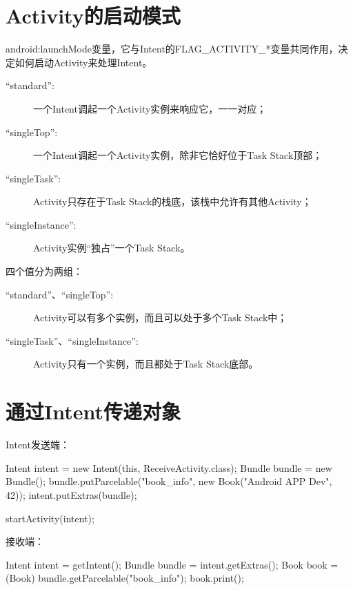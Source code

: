 ﻿\documentclass[a4paper,11pt]{article}
\begin{document}

  \section[Activity的启动模式]{Activity的启动模式}
  android:launchMode变量，它与Intent的FLAG\_ACTIVITY\_*变量共同作用，决定如何启动Activity来处理Intent。

  \begin{description}
    \item[``standard'':] 一个Intent调起一个Activity实例来响应它，一一对应；
    \item[``singleTop'':] 一个Intent调起一个Activity实例，除非它恰好位于Task Stack顶部；
    \item[``singleTask'':] Activity只存在于Task Stack的栈底，该栈中允许有其他Activity；
    \item[``singleInstance'':] Activity实例“独占”一个Task Stack。
  \end{description}

  四个值分为两组：

  \begin{description}
    \item[``standard''、``singleTop'':] Activity可以有多个实例，而且可以处于多个Task Stack中；
    \item[``singleTask''、``singleInstance'':] Activity只有一个实例，而且都处于Task Stack底部。
  \end{description}


  \section[通过Intent传递对象]{通过Intent传递对象}
  Intent发送端：\par
  \begin{javacode}
Intent intent = new Intent(this, ReceiveActivity.class);
Bundle bundle = new Bundle();
bundle.putParcelable("book_info", new Book("Android APP Dev", 42));
intent.putExtras(bundle);

startActivity(intent);
  \end{javacode}

  接收端：\par
  \begin{javacode}
Intent intent = getIntent();
Bundle bundle = intent.getExtras();
Book book = (Book) bundle.getParcelable("book_info");
book.print();
  \end{javacode}
\end{document}
